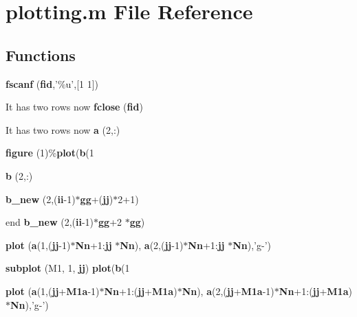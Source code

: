\section{plotting.\-m File Reference}
\label{plotting_8m}
\subsection*{Functions}
\begin{DoxyCompactItemize}
\item 
{\bf fscanf} ({\bf fid},'\%u',[1 1])
\item 
It has two rows now {\bf fclose} ({\bf fid})
\item 
It has two rows now {\bf a} (2,\-:)
\item 
{\bf figure} (1)\%{\bf plot}({\bf b}(1
\item 
{\bf b} (2,\-:)
\item 
{\bf b\-\_\-new} (2,({\bf ii}-\/1)$\ast${\bf gg}+({\bf jj})$\ast$2+1)
\item 
end {\bf b\-\_\-new} (2,({\bf ii}-\/1)$\ast${\bf gg}+2 $\ast${\bf gg})
\item 
{\bf plot} ({\bf a}(1,({\bf jj}-\/1)$\ast${\bf Nn}+1\-:{\bf jj} $\ast${\bf Nn}), {\bf a}(2,({\bf jj}-\/1)$\ast${\bf Nn}+1\-:{\bf jj} $\ast${\bf Nn}),'g-\/')
\item 
{\bf subplot} (M1, 1, {\bf jj}) {\bf plot}({\bf b}(1
\item 
{\bf plot} ({\bf a}(1,({\bf jj}+{\bf M1a}-\/1)$\ast${\bf Nn}+1\-:({\bf jj}+{\bf M1a})$\ast${\bf Nn}), {\bf a}(2,({\bf jj}+{\bf M1a}-\/1)$\ast${\bf Nn}+1\-:({\bf jj}+{\bf M1a})$\ast${\bf Nn}),'g-\/')
\end{DoxyCompactItemize}
